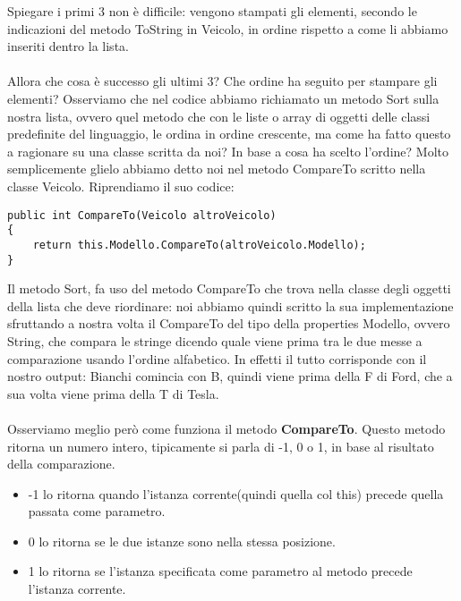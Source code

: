 \documentclass[]{article}
\begin{document}
Spiegare i primi 3 non è difficile: vengono stampati gli elementi, secondo le indicazioni
del metodo ToString in Veicolo, in ordine rispetto a come li abbiamo inseriti dentro la lista. \\ \\
Allora che cosa è successo gli ultimi 3? Che ordine ha seguito per stampare gli elementi?
Osserviamo che nel codice abbiamo richiamato un metodo Sort sulla nostra lista, ovvero quel
metodo che con le liste o array di oggetti delle classi predefinite del linguaggio, le ordina in ordine crescente, ma come ha fatto questo a ragionare su una classe scritta da noi? In base a cosa ha scelto l'ordine? Molto semplicemente glielo abbiamo detto noi nel
metodo CompareTo scritto nella classe Veicolo. Riprendiamo il suo codice:
\begin{verbatim}
public int CompareTo(Veicolo altroVeicolo)
{
	return this.Modello.CompareTo(altroVeicolo.Modello);
}
\end{verbatim}
Il metodo Sort, fa uso del metodo CompareTo che trova nella classe degli oggetti della lista
che deve riordinare: noi abbiamo quindi scritto la sua implementazione sfruttando a nostra
volta il CompareTo del tipo della properties Modello, ovvero String, che compara le stringe
dicendo quale viene prima tra le due messe a comparazione usando l'ordine alfabetico. In effetti il tutto corrisponde con il nostro output: Bianchi comincia con B, quindi viene prima della F di Ford, che a sua volta viene prima della T di Tesla. \\ \\
Osserviamo meglio però come funziona il metodo \textbf{CompareTo}. Questo metodo ritorna un numero intero, tipicamente si parla di -1, 0 o 1, in base al risultato della comparazione. 
\begin{itemize}
	\item -1 lo ritorna quando l'istanza corrente(quindi quella col this) precede quella passata come parametro.
	\item 0 lo ritorna se le due istanze sono nella stessa posizione.
	\item 1 lo ritorna se l'istanza specificata come parametro al metodo precede l'istanza corrente.
\end{itemize}
\end{document}
